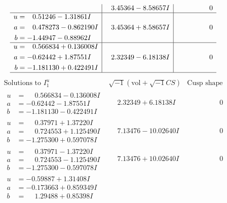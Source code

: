 \documentclass[1p]{elsarticle_modified}
\theoremstyle{definition}
\newcommand{\I}{\sqrt{-1}}
\begin{document}
$$\begin{array}{c|c|c}
 & \phantom{-}3.45364 - 8.58657 I & \phantom{-0.000000 } 0 \\ \hline\begin{aligned}
u &= \phantom{-}0.51246 - 1.31861 I \\
a &= \phantom{-}0.478273 - 0.862190 I \\
b &= -1.44947 - 0.88962 I\end{aligned}
 & \phantom{-}3.45364 + 8.58657 I & \phantom{-0.000000 } 0 \\ \hline\begin{aligned}
u &= \phantom{-}0.566834 + 0.136008 I \\
a &= -0.62442 + 1.87551 I \\
b &= -1.181130 + 0.422491 I\end{aligned}
 & \phantom{-}2.32349 - 6.18138 I & \phantom{-0.000000 } 0\\
 \hline 
 \end{array}$$\newpage$$\begin{array}{c|c|c}  
\text{Solutions to }I^u_{1}& \I (\text{vol} + \sqrt{-1}CS) & \text{Cusp shape}\\
 \hline 
\begin{aligned}
u &= \phantom{-}0.566834 - 0.136008 I \\
a &= -0.62442 - 1.87551 I \\
b &= -1.181130 - 0.422491 I\end{aligned}
 & \phantom{-}2.32349 + 6.18138 I & \phantom{-0.000000 } 0 \\ \hline\begin{aligned}
u &= \phantom{-}0.37971 + 1.37220 I \\
a &= \phantom{-}0.724553 + 1.125490 I \\
b &= -1.275300 + 0.597078 I\end{aligned}
 & \phantom{-}7.13476 - 10.02640 I & \phantom{-0.000000 } 0 \\ \hline\begin{aligned}
u &= \phantom{-}0.37971 - 1.37220 I \\
a &= \phantom{-}0.724553 - 1.125490 I \\
b &= -1.275300 - 0.597078 I\end{aligned}
 & \phantom{-}7.13476 + 10.02640 I & \phantom{-0.000000 } 0 \\ \hline\begin{aligned}
u &= -0.59887 + 1.31408 I \\
a &= -0.173663 + 0.859349 I \\
b &= \phantom{-}1.29488 + 0.85398 I\end{aligned}

\end{array}$$
\end{document}
